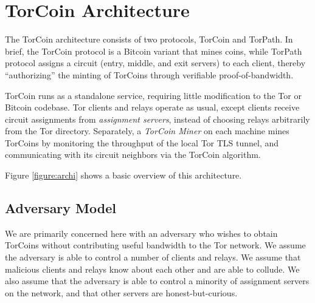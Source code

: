 \section{TorCoin Architecture} \label{arch}



The TorCoin architecture consists of two protocols, TorCoin and TorPath.
In brief, the TorCoin protocol is a Bitcoin variant that mines coins,
while TorPath protocol assigns a circuit (entry, middle, and exit servers) to
each client, thereby ``authorizing'' the minting of TorCoins
through verifiable proof-of-bandwidth.

TorCoin runs as a standalone service, requiring little modification to the
Tor or Bitcoin codebase. Tor clients and relays operate as usual,
except clients receive circuit
assignments from \textit{assignment servers},
instead of choosing relays arbitrarily from the Tor directory.
Separately, a \textit{TorCoin Miner} on each machine mines TorCoins by
monitoring the throughput of the local Tor TLS tunnel, and communicating with
its circuit neighbors via the TorCoin algorithm.

Figure \ref{figure:archi} shows a basic overview of this architecture.


\subsection{Adversary Model}
We are primarily concerned here with an adversary who
wishes to obtain TorCoins without contributing useful bandwidth
to the Tor network. We assume the adversary
is able to control a number of clients and relays. We assume that malicious
clients and relays know about each other and are able to collude.
We also assume that the adversary is able to control a minority of assignment
servers on the network, and that other servers are honest-but-curious.
